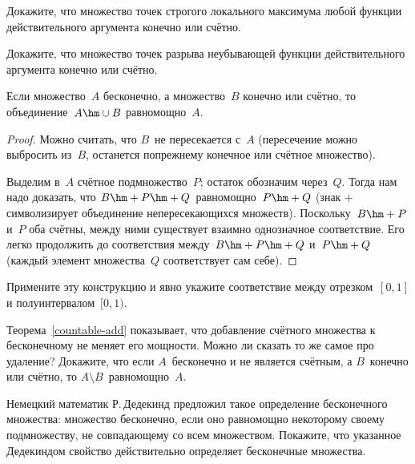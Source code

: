 \begin{problem}
Докажите, что множество точек строгого локального максимума любой
функции действительного аргумента конечно или счётно.
\end{problem}

\begin{problem}
Докажите, что множество точек разрыва неубывающей функции
действительного аргумента конечно или счётно.
\end{problem}

\problskip
\begin{theorem}\label{countable-add}
Если множество~$A$ бесконечно, а множество~$B$ конечно или счётно,
то объединение~$A\hm\cup B$ равномощно~$A$.
\end{theorem}

\begin{proof}
Можно считать, что $B$~не пересекается с~$A$ (пересечение можно
выбросить из~$B$, останется по\д прежнему конечное или счётное
множество).

Выделим в~$A$ счётное подмножество~$P$; остаток обозначим через~$Q$.
Тогда нам надо доказать, что $B\hm+P\hm+Q$~равномощно~$P\hm+Q$
(знак $+$ символизирует объединение непересекающихся множеств).
Поскольку~$B\hm+P$ и~$P$ оба счётны, между ними существует
взаимно однозначное соответствие. Его легко продолжить до
соответствия между~$B\hm+P\hm+Q$ и~$P\hm+Q$ (каждый элемент
множества~$Q$ соответствует сам себе).
\end{proof}

\begin{problem}
Примените эту конструкцию и явно укажите соответствие между
отрезком~$[0,1]$ и полуинтервалом~$[0,1)$.
\end{problem}

\begin{problem}
Теорема~\ref{countable-add} показывает, что добавление
счётного множества
к бесконечному не меняет его
мощности. Можно ли сказать то же самое про удаление?
Докажите, что если $A$~бесконечно и не является счётным,
а $B$~конечно или счётно, то
$A\setminus B$~равномощно~$A$.
\end{problem}

\begin{problem}
Немецкий математик Р.\,Дедекинд предложил такое
определение бесконечного множества: множество бесконечно, если
оно равномощно некоторому своему подмножеству, не совпадающему
со всем множеством. Покажите, что указанное Дедекиндом свойство
действительно определяет бесконечные множества.
\end{problem}

